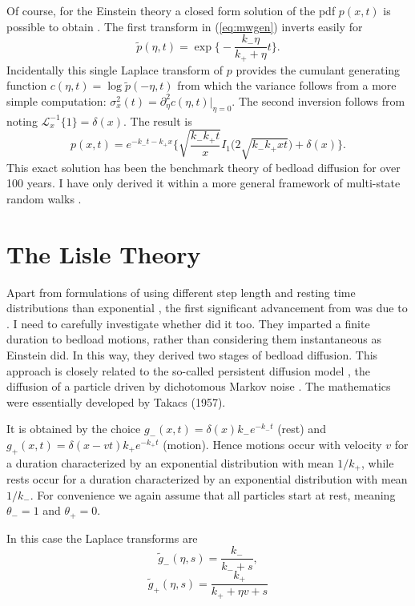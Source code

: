 \documentclass[11pt]{article}
\newcommand\be{\begin{equation}} %
\newcommand\ee{\end{equation}}   %
\newcommand\El{\mathcal{L}}
\newcommand\tg{\tilde{g}}
\begin{document}
Of course, for the Einstein theory a closed form solution of the pdf $p(x,t)$ is possible to obtain \citep[e.g.][]{Einstein1937, Hubbell1964, Daly2006,Daly2019}.
The first transform in (\ref{eq:mwgen}) inverts easily for \citep[i.e.][1.1.1.2]{Prudnikov1986}
\be \tilde{p}(\eta,t) = \exp\Big\{-\frac{k_-\eta }{k_+ + \eta} t\Big\}.\ee
Incidentally this single Laplace transform of $p$ provides the cumulant generating function $c(\eta,t) = \log \tilde{p}(-\eta,t)$ from which the variance follows from a more simple computation: $\sigma_x^2(t) = \partial_\eta^2 c(\eta,t)\big|_{\eta=0}.$
The second inversion follows from \citet[][2.2.2.8]{Prudnikov1986} noting $\El_x^{-1}\{1\} = \delta(x).$ The result is \citep[e.g.][]{Daly2019}
\be p(x,t) = e^{-k_- t -k_+ x}\Big\{ \sqrt{\frac{k_- k_+ t}{ x}} I_1\Big( 2\sqrt{k_-k_+ x t}\Big) + \delta(x) \Big\} .\ee
This exact solution has been the benchmark theory of bedload diffusion for over 100 years. I have only derived it within a more general framework of multi-state random walks \citep[e.g.][]{Weiss1994}.

\section{The Lisle Theory}
Apart from formulations of \citet{Einstein1937} using different step length and resting time distributions than exponential \citep[e.g.][]{Sayre1965}, the first significant advancement from \citet{Einstein1937} was due to \citet{Lisle1998}. 
I need to carefully investigate whether \citet{Gordon1972} did it too.
They imparted a finite duration to bedload motions, rather than considering them instantaneous as Einstein did. In this way, they derived two stages of bedload diffusion.
This approach is closely related to the so-called persistent diffusion model \citep{Balakrishnan1988,VanDenBroeck1990}, the diffusion of a particle driven by dichotomous Markov noise \citep[e.g.][]{Horsthemke1984,Risken1989,Bena2006}. 
The mathematics were essentially developed by Takacs (1957).

It is obtained by the choice $g_-(x,t) = \delta(x) k_- e^{-k_- t}$ (rest) and $g_+(x,t) = \delta(x-vt)k_+ e^{-k_+ t} $ (motion).
Hence motions occur with velocity $v$ for a duration characterized by an exponential distribution with mean $1/k_+$, while rests occur for a duration characterized by an exponential distribution with mean $1/k_-$. For convenience we again assume that all particles start at rest, meaning $\theta_- = 1$ and $\theta_+=0$.

In this case the Laplace transforms are
\be \tg_-(\eta,s) = \frac{k_-}{k_- + s}, \ee 
\be \tg_+(\eta,s) = \frac{k_+}{k_+ + \eta v + s }\ee
\end{document}
